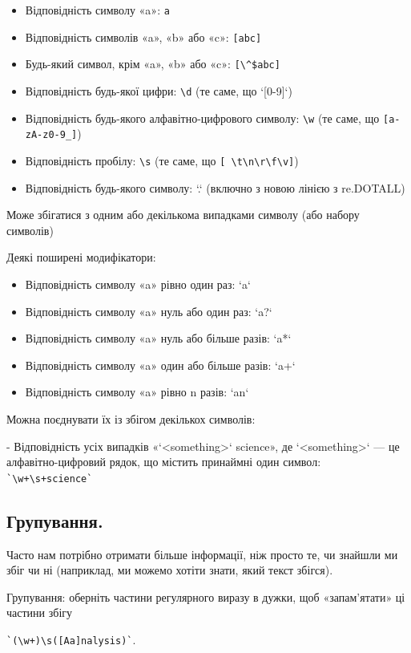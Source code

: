 \begin{itemize}
\item Відповідність символу «a»: \verb|a|
\item Відповідність символів «a», «b» або «c»: \verb|[abc]|
\item Будь-який символ, крім «a», «b» або «c»: \verb|[\^$abc]|
\item Відповідність будь-якої цифри: \verb|\d| (те саме, що `[0-9]`)
\item Відповідність будь-якого алфавітно-цифрового символу: \verb|\w| (те саме, що \verb|[a-zA-z0-9_]|)
\item Відповідність пробілу: \verb|\s| (те саме, що \verb|[ \t\n\r\f\v]|)
\item Відповідність будь-якого символу: `.` (включно з новою лінією з re.DOTALL)
\end{itemize}

Може збігатися з одним або декількома випадками символу (або набору символів)

Деякі поширені модифікатори:

\begin{itemize}
\item Відповідність символу «a» рівно один раз: `a`
\item Відповідність символу «a» нуль або один раз: `a?`
\item Відповідність символу «a» нуль або більше разів: `a*`
\item Відповідність символу «a» один або більше разів: `a+`
\item Відповідність символу «a» рівно n разів: `a{n}`
\end{itemize}

Можна поєднувати їх із збігом декількох символів:

- Відповідність усіх випадків «`<something>` science», де `<something>` — це алфавітно-цифровий рядок, що містить принаймні один символ:
\verb|`\w+\s+science`|

\subsection{Групування.}

Часто нам потрібно отримати більше інформації, ніж просто те, чи знайшли ми збіг чи ні (наприклад, ми можемо хотіти знати, який текст збігся).

Групування: оберніть частини регулярного виразу в дужки, щоб «запам'ятати» ці частини збігу 

\verb|`(\w+)\s([Aa]nalysis)`|.

